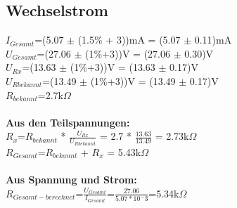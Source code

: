 \documentclass{article}
\begin{document}
\subsection*{Wechselstrom}
$I_{Gesamt}$=(5.07 $\pm$ (1.5\% + 3))mA = (5.07 $\pm$ 0.11)mA\\
$U_{Gesamt}$=(27.06 $\pm$ (1\%+3))V = (27.06 $\pm$ 0.30)V\\
$U_{Rx}$=(13.63 $\pm$ (1\%+3))V = (13.63 $\pm$ 0.17)V\\
$U_{Rbekannt}$=(13.49 $\pm$ (1\%+3))V = (13.49 $\pm$ 0.17)V\\
$R_{bekannt}$=2.7k$\Omega$\\
\\
\textbf{Aus den Teilspannungen:}\\
$R_x$=$R_{bekannt}$ * $\frac{U_{Rx}}{U_{Rbekannt}}$ = 2.7 * $\frac{13.63}{13.49}$ = 2.73k$\Omega$\\
$R_{Gesamt}$=$R_{bekannt}$ + $R_x$ = 5.43k$\Omega$\\
\\
\textbf{Aus Spannung und Strom:}\\
$R_{Gesamt-berechnet}$=$\frac{U_{Gesamt}}{I_{Gesamt}}$=$\frac{27.06}{5.07*10{^-3}}$=5.34k$\Omega$\\
\\
\end{document}
